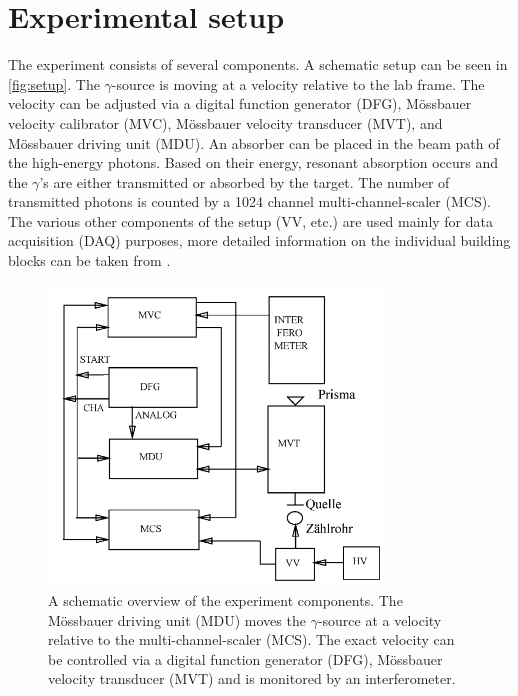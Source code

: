 
\section{Experimental setup}
\label{sec:setup}

The experiment consists of several components. A schematic setup can be seen in 
\autoref{fig:setup}. The $\gamma$-source is moving at a velocity relative to the lab 
frame. The velocity can be adjusted via a digital function generator (DFG), 
Mössbauer velocity calibrator (MVC), Mössbauer velocity transducer (MVT), and 
Mössbauer driving unit (MDU). An absorber can be placed in the beam path of the 
high-energy photons. Based on their energy, resonant absorption occurs and the $\gamma$'s are either transmitted or 
absorbed by the target. The number of transmitted photons is counted by a 1024 
channel multi-channel-scaler (MCS). The various other components of the setup (VV, 
etc.) are used mainly for data acquisition (DAQ) purposes, more detailed information 
on the individual building blocks can be taken from \cite{Sch17}.

\begin{figure}[h]
	\centering
	\includegraphics[width=0.8\textwidth]{./fig/setup.png}
	\caption{A schematic overview of the experiment components. The Mössbauer 
	driving unit (MDU) moves the $\gamma$-source at a velocity relative to the 
	multi-channel-scaler (MCS). The exact velocity can be controlled via a 
	digital function generator (DFG), Mössbauer velocity transducer (MVT) and is 
	monitored by an interferometer.}
	\label{fig:setup}
\end{figure}
